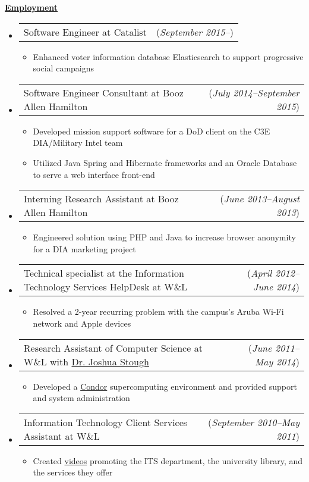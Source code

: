 \documentclass[11pt, letterpaper]{letter}
\makeatletter
\newlength{\indwidth}				\setlength{\indwidth}{\textwidth-.4in}
\newlength{\listSpacing}			\setlength{\listSpacing}{.0375in}
\newlength{\headerAntispace}		\setlength{\headerAntispace}{-6pt}
\newlength{\subListAntispace}		\setlength{\subListAntispace}{-.25in}
\newlength{\subListMidAntispace}	\setlength{\subListMidAntispace}{-2.5pt}
\newlength{\subListEndAntispace}	\setlength{\subListEndAntispace}{-.075in}
\newcommand{\lst}[1]{\vspace{\subListAntispace}\begin{itemize} \item #1 \end{itemize}\vspace{\subListEndAntispace}}
\newcommand{\dated}[2]{
	\begin{tabular*}{\indwidth}{l@{\extracolsep{\fill}}r}#1 & (\textit{#2})\end{tabular*}}
\newcommand{\datedTwo}[3]{
	\begin{tabular*}{\indwidth}{l@{\extracolsep{\fill}}r}#1 & (\textit{#2}) (\textit{#3})\end{tabular*}}
\newcommand \myul[3]{%
	\begingroup%
	\renewcommand \ULdepth {#1}%
	\renewcommand \ULthickness {#2}%
	\uline{#3}%
	\endgroup%
}
\newcommand \sectionheader[1]{
	\myul{2.7pt}{0.5pt}{\large \textbf{#1}}
}
\makeatother
\begin{document}
\sectionheader{Employment}
\vspace{\headerAntispace}
\begin{itemize}
	\setlength{\itemsep}{\listSpacing}
	\item \dated{Software Engineer at Catalist}{September 2015--}
		\lst{Enhanced voter information database Elasticsearch to support progressive social campaigns}
	\item \dated{Software Engineer Consultant at Booz Allen Hamilton}{July 2014--September 2015}
	\lst{
		Developed mission support software for a DoD client on the C3E DIA/Military Intel team
		\vspace{\subListMidAntispace}
		\item Utilized Java Spring and Hibernate frameworks and an Oracle Database to serve a web
		      interface front-end
		\vspace{\subListMidAntispace}
	}
	\item \dated{Interning Research Assistant at Booz Allen Hamilton}{June 2013--August 2013}
		\lst{Engineered solution using PHP and Java to increase browser anonymity for a DIA
		     marketing project}
	\item \dated{Technical specialist at the Information Technology Services HelpDesk at W\&L}
	            {April 2012--June 2014}
		\lst{Resolved a 2-year recurring problem with the campus's Aruba Wi-Fi network and Apple devices}
	\item \dated{Research Assistant of Computer Science at W\&L with 
	             \href{http://cs.wlu.edu/~stough/}{Dr. Joshua Stough}}
	            {June 2011--May 2014}
		\lst{Developed a \href{http://www.htcondorproject.org/}{Condor} supercomputing environment and provided support and system administration
		}
	\item \dated{Information Technology Client Services Assistant at W\&L}{September 2010--May 2011}
		\lst{Created \href{http://youtu.be/NvOarFOmly0?hd=1}{videos} promoting the ITS department,
		     the university library, and the services they offer
		}
	\iftoggle{smithbros}{
		\item \datedTwo{File Digitizer at Smith Brothers Abstract and Title Co.}
				{June 2009--August 2009}{June 2010--August 2010}
	}{}
\end{itemize}
\end{document}
